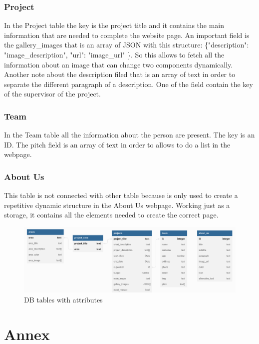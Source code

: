 \documentclass[11pt, letterpaper]{article}
\begin{document}
\subsubsection*{Project}
In the Project table the key is the project title and it contains the main information that are needed to complete the website page. An important field is the gallery\_images that is an array of JSON with this structure: \{"description": "image\_description", "url": "image\_url" \}. So this allows to fetch all the information about an image that can change two components dynamically.
Another note about the description filed that is an array of text in order to separate the different paragraph of a description. One of the field contain the key of the supervisor of the project.

\subsubsection*{Team}
In the Team table all the information about the person are present. The key is an ID. The pitch field is an array of text in order to allows to do a list in the webpage.

\subsubsection*{About Us}
This table is not connected with other table because is only used to create a repetitive dynamic structure in the About Us webpage. Working just as a storage,  it contains all the elements needed to create the correct page.

\begin{figure}[H]
    \centering
    \includegraphics[width=17cm]{images/ER Diagram hyper.png}
    \caption{DB tables with attributes}
    \label{fig:DB_tables}
\end{figure}

\clearpage

\section{Annex}
\end{document}
